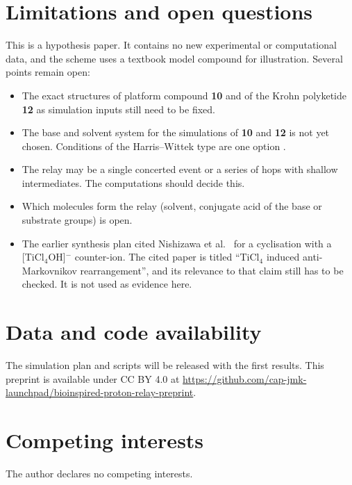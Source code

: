 \documentclass[11pt]{article}
\begin{document}
\section{Limitations and open questions}
This is a hypothesis paper. It contains no new experimental or computational data, and the scheme uses a textbook model compound for illustration. Several points remain open:
\begin{itemize}
\item The exact structures of platform compound \textbf{10} and of the Krohn polyketide \textbf{12} as simulation inputs still need to be fixed.
\item The base and solvent system for the simulations of \textbf{10} and \textbf{12} is not yet chosen. Conditions of the Harris--Wittek type are one option \cite{harris1975}.
\item The relay may be a single concerted event or a series of hops with shallow intermediates. The computations should decide this.
\item Which molecules form the relay (solvent, conjugate acid of the base or substrate groups) is open.
\item The earlier synthesis plan \cite{kleber2020} cited Nishizawa et al.\ \cite{nishizawa2006} for a cyclisation with a [TiCl$_4$OH]$^-$ counter-ion. The cited paper is titled ``TiCl$_4$ induced anti-Markovnikov rearrangement'', and its relevance to that claim still has to be checked. It is not used as evidence here.
\end{itemize}

\section*{Data and code availability}
The simulation plan and scripts will be released with the first results. This preprint is available under CC BY 4.0 at \url{https://github.com/cap-jmk-launchpad/bioinspired-proton-relay-preprint}.

\section*{Competing interests}
The author declares no competing interests.
\end{document}
